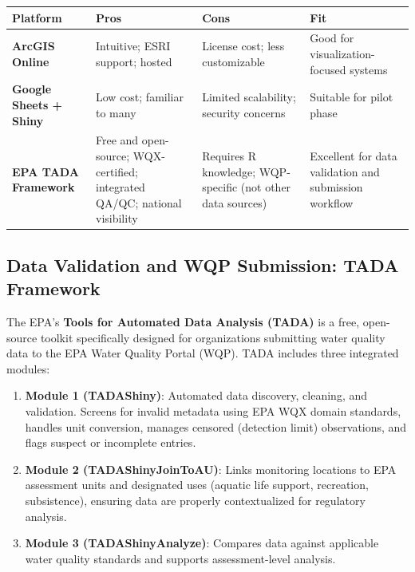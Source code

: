 \documentclass[
  letterpaper,
]{scrbook}
\begin{document}
\begin{longtable}[]{@{}
  >{\raggedright\arraybackslash}p{}
  >{\raggedright\arraybackslash}p{}
  >{\raggedright\arraybackslash}p{}
  >{\raggedright\arraybackslash}p{}@{}}
\toprule\noalign{}
\begin{minipage}[b]{\linewidth}\raggedright
Platform
\end{minipage} & \begin{minipage}[b]{\linewidth}\raggedright
Pros
\end{minipage} & \begin{minipage}[b]{\linewidth}\raggedright
Cons
\end{minipage} & \begin{minipage}[b]{\linewidth}\raggedright
Fit
\end{minipage} \\
\midrule\noalign{}
\endhead
\bottomrule\noalign{}
\endlastfoot
\textbf{ArcGIS Online} & Intuitive; ESRI support; hosted & License cost;
less customizable & Good for visualization-focused systems \\
\textbf{Google Sheets + Shiny} & Low cost; familiar to many & Limited
scalability; security concerns & Suitable for pilot phase \\
\textbf{EPA TADA Framework} & Free and open-source; WQX-certified;
integrated QA/QC; national visibility & Requires R knowledge;
WQP-specific (not other data sources) & Excellent for data validation
and submission workflow \\
\end{longtable}

\subsection{Data Validation and WQP Submission: TADA
Framework}\label{data-validation-and-wqp-submission-tada-framework}

The EPA's \textbf{Tools for Automated Data Analysis (TADA)} is a free,
open-source toolkit specifically designed for organizations submitting
water quality data to the EPA Water Quality Portal (WQP). TADA includes
three integrated modules:

\begin{enumerate}
\def\labelenumi{\arabic{enumi}.}
\item
  \textbf{Module 1 (TADAShiny)}: Automated data discovery, cleaning, and
  validation. Screens for invalid metadata using EPA WQX domain
  standards, handles unit conversion, manages censored (detection limit)
  observations, and flags suspect or incomplete entries.
\item
  \textbf{Module 2 (TADAShinyJoinToAU)}: Links monitoring locations to
  EPA assessment units and designated uses (aquatic life support,
  recreation, subsistence), ensuring data are properly contextualized
  for regulatory analysis.
\item
  \textbf{Module 3 (TADAShinyAnalyze)}: Compares data against applicable
  water quality standards and supports assessment-level analysis.
\end{enumerate}
\end{document}
